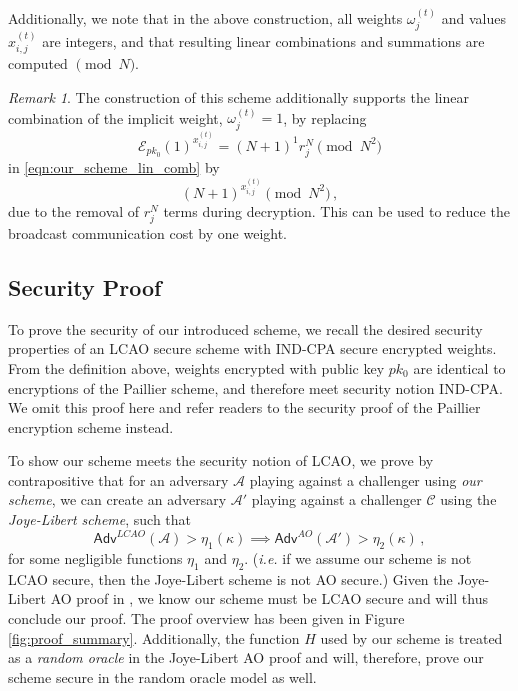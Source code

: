 \documentclass[10pt,journal,compsoc]{IEEEtran}
\theoremstyle{definition}
\theoremstyle{definition}
\theoremstyle{remark}
\newtheorem*{remark}{Remark}
\begin{document}
Additionally, we note that in the above construction, all weights $\omega^{(t)}_j$ and values $x^{(t)}_{i,j}$ are integers, and that resulting linear combinations and summations are computed $\pmod{N}$.

\begin{remark} \label{rem:lcao_implicit_weight}
    The construction of this scheme additionally supports the linear combination of the implicit weight, $\omega^{(t)}_j = 1$, by replacing
    \begin{equation}
        \mathcal{E}_{pk_0}(1)^{x^{(t)}_{i,j}} = (N+1)^{1}r_j^N \pmod{N^2}
    \end{equation}
    in \eqref{eqn:our_scheme_lin_comb} by
    \begin{equation}
        (N+1)^{x^{(t)}_{i,j}} \pmod{N^2}\,,
    \end{equation}
    due to the removal of $r_j^N$ terms during decryption. This can be used to reduce the broadcast communication cost by one weight.
\end{remark}

% 
% 

\subsection{Security Proof}
To prove the security of our introduced scheme, we recall the desired security properties of an LCAO secure scheme with IND-CPA secure encrypted weights. From the definition above, weights encrypted with public key $pk_0$ are identical to encryptions of the Paillier scheme, and therefore meet security notion IND-CPA. We omit this proof here and refer readers to the security proof of the Paillier encryption scheme \cite{paillierPublicKeyCryptosystemsBased1999} instead.

To show our scheme meets the security notion of LCAO, we prove by contrapositive that for an adversary $\mathcal{A}$ playing against a challenger using \textit{our scheme}, we can create an adversary $\mathcal{A}'$ playing against a challenger $\mathcal{C}$ using the \textit{Joye-Libert scheme}, such that
\begin{equation*}
    \mathsf{Adv}^{LCAO}(\mathcal{A}) > \eta_1(\kappa) \implies \mathsf{Adv}^{AO}(\mathcal{A}') > \eta_2(\kappa)\,,
\end{equation*}
for some negligible functions $\eta_1$ and $\eta_2$. (\textit{i.e.} if we assume our scheme is not LCAO secure, then the Joye-Libert scheme is not AO secure.) Given the Joye-Libert AO proof in \cite{joyeScalableSchemePrivacyPreserving2013}, we know our scheme must be LCAO secure and will thus conclude our proof. The proof overview has been given in Figure \ref{fig:proof_summary}. Additionally, the function $H$ used by our scheme is treated as a \textit{random oracle} in the Joye-Libert AO proof and will, therefore, prove our scheme secure in the random oracle model as well.
\end{document}
